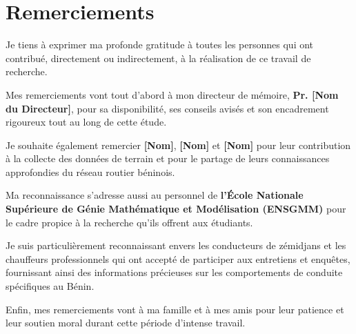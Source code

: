 \chapter*{Remerciements}
\thispagestyle{empty}

Je tiens à exprimer ma profonde gratitude à toutes les personnes qui ont contribué, directement ou indirectement, à la réalisation de ce travail de recherche.

\vspace{0.5cm}

Mes remerciements vont tout d'abord à mon directeur de mémoire, \textbf{Pr. [Nom du Directeur]}, pour sa disponibilité, ses conseils avisés et son encadrement rigoureux tout au long de cette étude.

\vspace{0.5cm}

Je souhaite également remercier \textbf{[Nom]}, \textbf{[Nom]} et \textbf{[Nom]} pour leur contribution à la collecte des données de terrain et pour le partage de leurs connaissances approfondies du réseau routier béninois.

\vspace{0.5cm}

Ma reconnaissance s'adresse aussi au personnel de \textbf{l'École Nationale Supérieure de Génie Mathématique et Modélisation (ENSGMM)} pour le cadre propice à la recherche qu'ils offrent aux étudiants.

\vspace{0.5cm}

Je suis particulièrement reconnaissant envers les conducteurs de zémidjans et les chauffeurs professionnels qui ont accepté de participer aux entretiens et enquêtes, fournissant ainsi des informations précieuses sur les comportements de conduite spécifiques au Bénin.

\vspace{0.5cm}

Enfin, mes remerciements vont à ma famille et à mes amis pour leur patience et leur soutien moral durant cette période d'intense travail.
